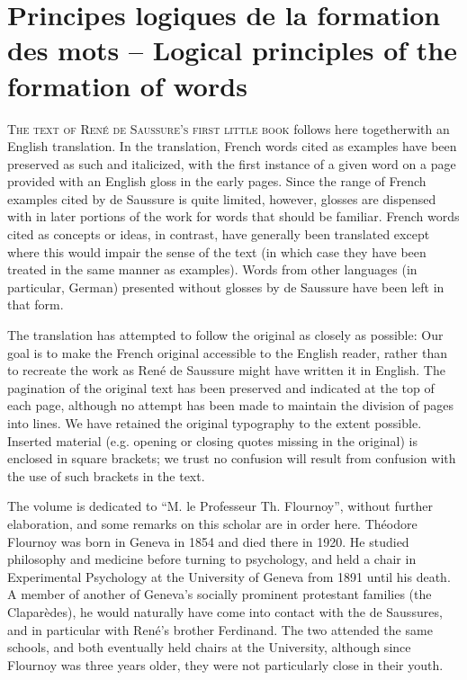 
\chapter*{Principes logiques de la formation des mots -- Logical principles of the formation of words}
\label{ch.1911text}

\begin{refsection}
\lettrine[loversize=0.1, nindent=0em]{T}{he text of René de
  Saussure's first little book} follows here together\linebreak with an English
translation.  In the translation, French words cited as examples have
been preserved as such and italicized, with the first instance of a given
word on a page provided with an English gloss in the early pages.
Since the range of French examples cited by de Saussure is quite
limited, however, glosses are dispensed with in later portions of the
work for words that should be familiar.  French words cited as
concepts or ideas, in contrast, have generally been translated except
where this would impair the sense of the text (in which case they have
been treated in the same manner as examples). Words from other
languages (in particular, German) presented without glosses by de
Saussure have been left in that form.

The translation has attempted to follow the original as closely as
possible: Our goal is to make the French original accessible to the
English reader, rather than to recreate the work as René de Saussure
might have written it in English. The pagination of the original text
has been preserved and indicated at the top of each page, although no
attempt has been made to maintain the division of pages into lines. We
have retained the original typography to the extent possible. Inserted
material (e.g. opening or closing quotes missing in the original) is
enclosed in square brackets; we trust no confusion will result from
confusion with the use of such brackets in the text.\largerpage[2]

The volume is dedicated to ``M. le Professeur Th. Flournoy'', without
further elaboration, and some remarks on this scholar are in order
here. Théodore Flournoy was born in Geneva in 1854 and died there in
1920.  He studied philosophy and medicine before turning to
psychology, and held a chair in Experimental Psychology at the
University of Geneva from 1891 until his death. A member of another of
Geneva's socially prominent protestant families (the Claparèdes), he
would naturally have come into contact with the de Saussures, and in
particular with René's brother Ferdinand. The two attended the same
schools, and both eventually held chairs at the University, although
since Flournoy was three years older, they were not particularly close
in their youth.\newpage


\end{refsection}
